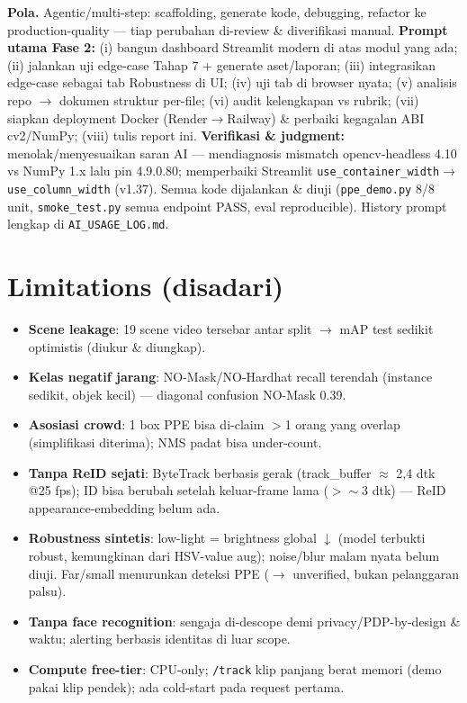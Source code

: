 \documentclass[10pt,a4paper]{article}
\newcommand{\code}[1]{\texttt{\small #1}}
\begin{document}
\textbf{Pola.} Agentic/multi-step: scaffolding, generate kode, debugging, refactor ke production-quality --- tiap perubahan di-review \& diverifikasi manual. \textbf{Prompt utama Fase 2:} (i) bangun dashboard Streamlit modern di atas modul yang ada; (ii) jalankan uji edge-case Tahap 7 + generate aset/laporan; (iii) integrasikan edge-case sebagai tab Robustness di UI; (iv) uji tab di browser nyata; (v) analisis repo $\rightarrow$ dokumen struktur per-file; (vi) audit kelengkapan vs rubrik; (vii) siapkan deployment Docker (Render$\rightarrow$Railway) \& perbaiki kegagalan ABI cv2/NumPy; (viii) tulis report ini. \textbf{Verifikasi \& judgment:} menolak/menyesuaikan saran AI --- mendiagnosis mismatch opencv-headless 4.10 vs NumPy 1.x lalu pin 4.9.0.80; memperbaiki Streamlit \code{use\_container\_width}$\rightarrow$\code{use\_column\_width} (v1.37). Semua kode dijalankan \& diuji (\code{ppe\_demo.py} 8/8 unit, \code{smoke\_test.py} semua endpoint PASS, eval reproducible). History prompt lengkap di \code{AI\_USAGE\_LOG.md}.

\section{Limitations (disadari)}
\begin{itemize}
\item \textbf{Scene leakage}: 19 scene video tersebar antar split $\rightarrow$ mAP test sedikit optimistis (diukur \& diungkap).
\item \textbf{Kelas negatif jarang}: NO-Mask/NO-Hardhat recall terendah (instance sedikit, objek kecil) --- diagonal confusion NO-Mask 0.39.
\item \textbf{Asosiasi crowd}: 1 box PPE bisa di-claim $>$1 orang yang overlap (simplifikasi diterima); NMS padat bisa under-count.
\item \textbf{Tanpa ReID sejati}: ByteTrack berbasis gerak (track\_buffer $\approx$ 2,4 dtk @25 fps); ID bisa berubah setelah keluar-frame lama ($>\!\sim$3 dtk) --- ReID appearance-embedding belum ada.
\item \textbf{Robustness sintetis}: low-light = brightness global $\downarrow$ (model terbukti robust, kemungkinan dari HSV-value aug); noise/blur malam nyata belum diuji. Far/small menurunkan deteksi PPE ($\rightarrow$ unverified, bukan pelanggaran palsu).
\item \textbf{Tanpa face recognition}: sengaja di-descope demi privacy/PDP-by-design \& waktu; alerting berbasis identitas di luar scope.
\item \textbf{Compute free-tier}: CPU-only; \code{/track} klip panjang berat memori (demo pakai klip pendek); ada cold-start pada request pertama.
\end{itemize}
\end{document}

